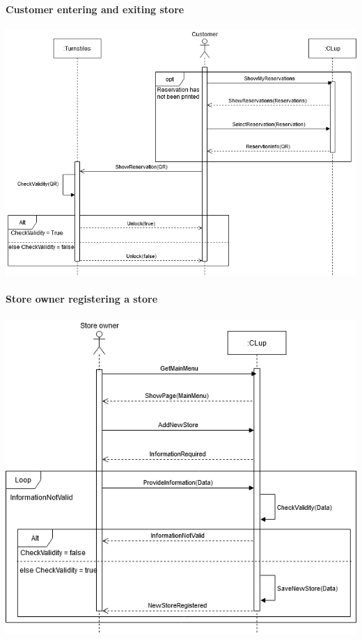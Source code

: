 \paragraph{Customer entering and exiting store}
\begin{flushleft}
	\includegraphics[scale=0.5]{Images/UseCase6-7Diagram.png}
\end{flushleft}
\newpage
\paragraph{Store owner registering a store}
\begin{flushleft}
	\includegraphics[scale=0.5]{Images/UseCase8Diagram.png}
\end{flushleft}
